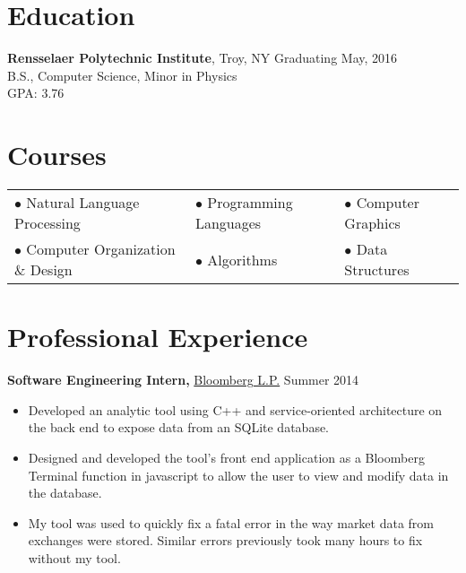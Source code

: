 \documentclass[margin]{res}
\begin{document}
 
\begin{minipage}{\textwidth}

 
\address{{\bf Present Address} \\ 2166 14th St \\ 2nd Floor \\ Troy, NY 12180 }
\address{{\bf Permanent Address} \\ 4 Oak Street \\ Cumberland, ME 04021 }
\begin{resume} 
 
\section{Education} 
{\bf Rensselaer Polytechnic Institute}, Troy, NY \hfill Graduating May, 2016 \\
B.S., Computer Science, Minor in Physics \\
GPA: 3.76
 
\section{Courses}
\begin{tabular}{lll}
$\bullet$ Natural Language Processing & $\bullet$ Programming Languages & $\bullet$ Computer Graphics \\
$\bullet$ Computer Organization \& Design & $\bullet$ Algorithms & $\bullet$ Data Structures \\
\end{tabular}

\section{Professional Experience}
{\bf Software Engineering Intern,} \uline{Bloomberg L.P.} \hfill Summer 2014
 \begin{itemize} \itemsep -2pt
 \item Developed an analytic tool using C++ and service-oriented architecture on the back end to expose data from an SQLite database.
 \item Designed and developed the tool's front end application as a Bloomberg Terminal function in javascript to allow the user to view and modify data in the database.
 \item My tool was used to quickly fix a fatal error in the way market data from exchanges were stored. Similar errors previously took many hours to fix without my tool.
 \end{itemize}




\end{resume}
\end{minipage}
\end{document}
